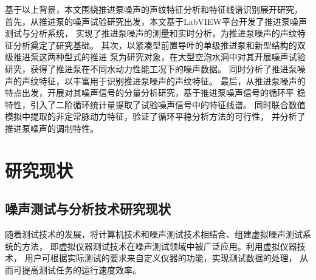 基于以上背景，本文围绕推进泵噪声的声纹特征分析和特征线谱识别展开研究，
首先，从推进泵的噪声试验研究出发，本文基于LabVIEW平台开发了推进泵噪声测试与分析系统，
实现了推进泵噪声的测量和实时分析，为推进泵噪声的声纹特征分析奠定了研究基础。 
其次，以紧凑型前置导叶的单级推进泵和新型结构的双级推进泵这两种型式的推进
泵为研究对象，在大型空泡水洞中对其开展噪声试验研究，获得了推进泵在不同水动力性能工况下的噪声数据。
同时分析了推进泵噪声的声纹特征，以丰富用于识别推进泵噪声的声纹特征。
最后，从推进泵噪声的特点出发，开展对其噪声信号的分量分析研究，基于推进泵噪声信号的循环平
稳特性，引入了二阶循环统计量提取了试验噪声信号中的特征线谱。
同时联合数值模拟中提取的非定常脉动力特征，验证了循环平稳分析方法的可行性，
并分析了推进泵噪声的调制特性。

\begin{comment}

目前针对推进泵流致激励特性的研究已经开展了大量工作，研究主要集中通过数值模拟获取
压力脉动特性、激振力特性等方面，难以通过试验精确获取流致激励源特征。
其中蕴含着丰富的流致激励
源信息，但是传统的频谱分析及解调方法无法实现高精度低频调制特征的提取。

\end{comment}

\section{研究现状}
\subsection{噪声测试与分析技术研究现状}
\begin{comment}
水下环境噪声数据采集装置对于水声试验来说是不可缺少的，因此设计
一套高性能的、能够适应水声信号特点的数据采集
系统十分必要。水声信号在水中传播时，水中的自然
环境极其复杂，要求所采用的数据采集器能够适应水下恶劣的自然环境，不但具有较大的动态范围，
所采集信号的幅度范围要尽可能宽，而且试验现场的数据量很大，常常需要多通道同步进行数据采集，
这样，对数据采集器提出了很高的要求。另外，从节约成本的角度考虑，又要求所采用的系统应该具有
一定的通用性和灵活的扩展能力。文中所要完成的
工作正是基于这一目的而展开的。

随着测试技术的发展，目前对传统的复杂仪器，分析方法的依赖性在减少，而正在流行着一种 
将计算机技术和噪声测试技术相结合、组建虚拟噪 
声测试系统的方法，即将虚拟仪器技术的测试技术 
引到噪声测试领域中，借助计算机软件技术来设计 
噪声分析软件。


\end{comment}
随着测试技术的发展，将计算机技术和噪声测试技术相结合、组建虚拟噪声测试系统的方法，
即虚拟仪器测试技术在噪声测试领域中被广泛应用\cite{yu2018}。利用虚拟仪器技术，
用户可根据实际测试的要求来自定义仪器的功能，实现测试数据的处理，
从而可提高测试任务的运行速度效率\cite{tang2021}。

